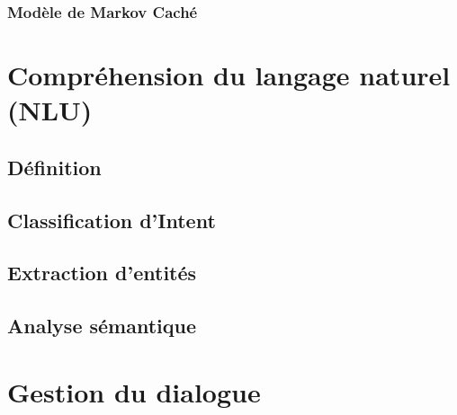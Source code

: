 			\paragraph{}
		\subsubsection{Modèle de Markov Caché}
			\paragraph{}
\section{Compréhension du langage naturel (NLU)}
	\paragraph{}
	\subsection{Définition}
		\paragraph{}
	\subsection{Classification d'Intent}
		\paragraph{}
	\subsection{Extraction d'entités}
		\paragraph{}
	\subsection{Analyse sémantique}

\section{Gestion du dialogue}
